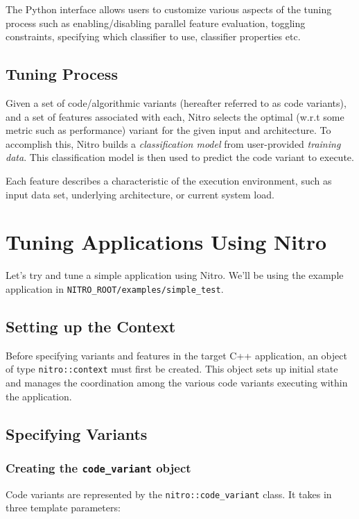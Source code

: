 \documentclass[12pt]{article}
\begin{document}
The Python interface allows users to customize various aspects of the tuning
process such as enabling/disabling parallel feature evaluation, toggling
constraints, specifying which classifier to use, classifier properties etc.

\subsection{Tuning Process}
Given a set of code/algorithmic variants (hereafter referred to as code variants), and a
set of features associated with each, Nitro selects the optimal (w.r.t some
metric such as performance) variant for the given input and architecture. To accomplish
this, Nitro builds a \textsl{classification model} from user-provided \textsl{training data}.
This classification model is then used to predict the code variant to execute.

Each feature describes a characteristic of the execution environment, such as input
data set, underlying architecture, or current system load.

\section{Tuning Applications Using Nitro}

Let's try and tune a simple application using Nitro. We'll be using the
example application in \texttt{NITRO\_ROOT/examples/simple\_test}.

\subsection{Setting up the Context}
Before specifying variants and features in the target C++ application,
an object of type \texttt{nitro::context} must first be created. This object
sets up initial state and manages the coordination among the various
code variants executing within the application.


\subsection{Specifying Variants}

\subsubsection{Creating the \texttt{code\_variant} object}
Code variants are represented by the \texttt{nitro::code\_variant} class.
It takes in three template parameters:
\end{document}
